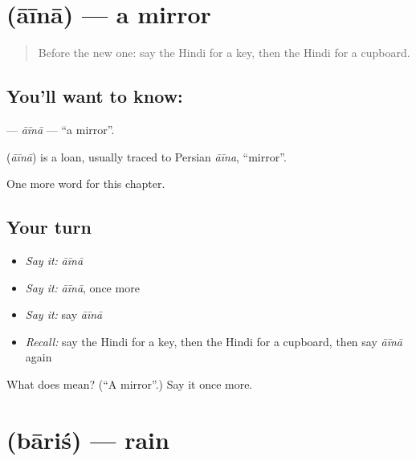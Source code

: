 \section[\texorpdfstring{\hi{आईना} (āīnā)}{आईना (āīnā)}]{ (āīnā) — a mirror}

\label{lesson:HI-C184-aina}



\begin{quote}
Before the new one: say the Hindi for a key, then the Hindi for a cupboard.
\end{quote}

\subsection*{You'll want to know: }
\textbf{} — \emph{āīnā} — \textquotedblleft{}a mirror\textquotedblright{}.

\begin{cousinweb}
\textbf{} (\emph{āīnā}) is a loan, usually traced to Persian \emph{āīna}, \textquotedblleft{}mirror\textquotedblright{}.
\end{cousinweb}

\begin{grammarlens}[title={What you've built}]
One more word for this chapter.
\end{grammarlens}

\subsection*{Your turn}
\begin{itemize}
\raggedright
  \item \emph{Say it:} \emph{āīnā}
  \item \emph{Say it:} \emph{āīnā}, once more
  \item \emph{Say it:} say \emph{āīnā}
  \item \emph{Recall:} say the Hindi for a key, then the Hindi for a cupboard, then say \emph{āīnā} again
\end{itemize}

\begin{tcolorbox}[breakable,colback=teal!4,colframe=teal!35!black,title={Before you move on}]
What does  mean? (\textquotedblleft{}A mirror\textquotedblright{}.) Say it once more.
\end{tcolorbox}
\section[\texorpdfstring{\hi{बारिश} (bāriś)}{बारिश (bāriś)}]{ (bāriś) — rain}


